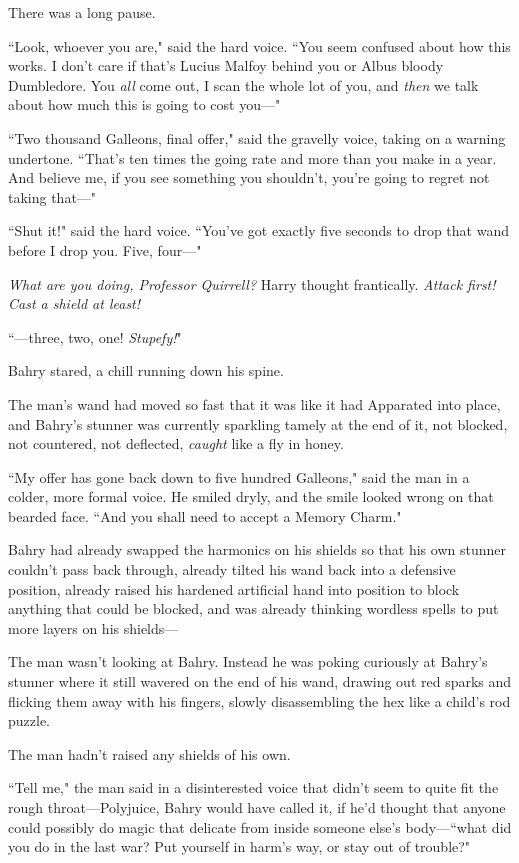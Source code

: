 There was a long pause.

``Look, whoever you are," said the hard voice. ``You seem confused about how this works. I don't care if that's Lucius Malfoy behind you or Albus bloody Dumbledore. You \emph{all} come out, I scan the whole lot of you, and \emph{then} we talk about how much this is going to cost you—"

``Two thousand Galleons, final offer," said the gravelly voice, taking on a warning undertone. ``That's ten times the going rate and more than you make in a year. And believe me, if you see something you shouldn't, you're going to regret not taking that—"

``Shut it!" said the hard voice. ``You've got exactly five seconds to drop that wand before I drop you. Five, four—"

\emph{What are you doing, Professor Quirrell?} Harry thought frantically. \emph{Attack first! Cast a shield at least!}

``—three, two, one! \emph{Stupefy!}"

\later

Bahry stared, a chill running down his spine.

The man's wand had moved so fast that it was like it had Apparated into place, and Bahry's stunner was currently sparkling tamely at the end of it, not blocked, not countered, not deflected, \emph{caught} like a fly in honey.

``My offer has gone back down to five hundred Galleons," said the man in a colder, more formal voice. He smiled dryly, and the smile looked wrong on that bearded face. ``And you shall need to accept a Memory Charm."

Bahry had already swapped the harmonics on his shields so that his own stunner couldn't pass back through, already tilted his wand back into a defensive position, already raised his hardened artificial hand into position to block anything that could be blocked, and was already thinking wordless spells to put more layers on his shields—

The man wasn't looking at Bahry. Instead he was poking curiously at Bahry's stunner where it still wavered on the end of his wand, drawing out red sparks and flicking them away with his fingers, slowly disassembling the hex like a child's rod puzzle.

The man hadn't raised any shields of his own.

``Tell me," the man said in a disinterested voice that didn't seem to quite fit the rough throat—Polyjuice, Bahry would have called it, if he'd thought that anyone could possibly do magic that delicate from inside someone else's body—``what did you do in the last war? Put yourself in harm's way, or stay out of trouble?"

